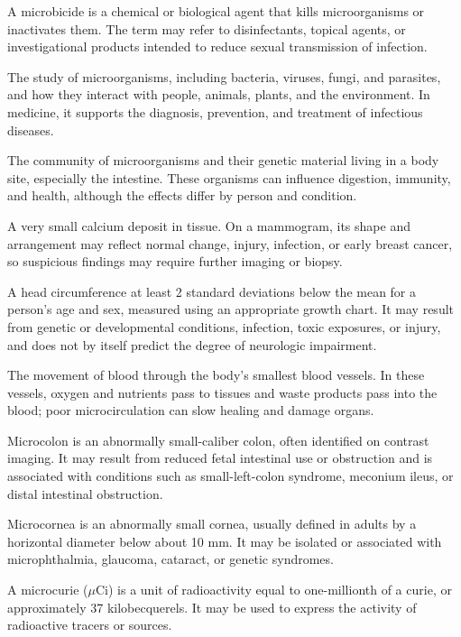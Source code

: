  A microbicide is a chemical or biological agent that kills microorganisms or inactivates them. The term may refer to disinfectants, topical agents, or investigational products intended to reduce sexual transmission of infection.

 The study of microorganisms, including bacteria, viruses, fungi, and parasites, and how they interact with people, animals, plants, and the environment. In medicine, it supports the diagnosis, prevention, and treatment of infectious diseases.

 The community of microorganisms and their genetic material living in a body site, especially the intestine. These organisms can influence digestion, immunity, and health, although the effects differ by person and condition.

 A very small calcium deposit in tissue. On a mammogram, its shape and arrangement may reflect normal change, injury, infection, or early breast cancer, so suspicious findings may require further imaging or biopsy.

 A head circumference at least 2 standard deviations below the mean for a person’s age and sex, measured using an appropriate growth chart. It may result from genetic or developmental conditions, infection, toxic exposures, or injury, and does not by itself predict the degree of neurologic impairment.

 The movement of blood through the body's smallest blood vessels. In these vessels, oxygen and nutrients pass to tissues and waste products pass into the blood; poor microcirculation can slow healing and damage organs.

 Microcolon is an abnormally small-caliber colon, often identified on contrast imaging. It may result from reduced fetal intestinal use or obstruction and is associated with conditions such as small-left-colon syndrome, meconium ileus, or distal intestinal obstruction.

 Microcornea is an abnormally small cornea, usually defined in adults by a horizontal diameter below about 10 mm. It may be isolated or associated with microphthalmia, glaucoma, cataract, or genetic syndromes.

 A microcurie ($\mu$Ci) is a unit of radioactivity equal to one-millionth of a curie, or approximately 37 kilobecquerels. It may be used to express the activity of radioactive tracers or sources.

